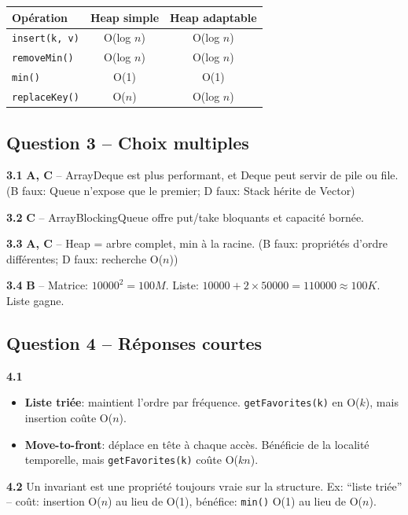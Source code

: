\documentclass[11pt,letterpaper]{article}
\begin{document}
\begin{center}
\renewcommand{\arraystretch}{1.5}
\begin{tabular}{|l|c|c|}
\hline
\textbf{Opération} & \textbf{Heap simple} & \textbf{Heap adaptable} \\
\hline
\texttt{insert(k, v)} & O(log $n$) & O(log $n$) \\
\hline
\texttt{removeMin()} & O(log $n$) & O(log $n$) \\
\hline
\texttt{min()} & O(1) & O(1) \\
\hline
\texttt{replaceKey()} & O($n$) & O(log $n$) \\
\hline
\end{tabular}
\end{center}

\subsection*{Question 3 -- Choix multiples}

\textbf{3.1} \textbf{A, C} -- ArrayDeque est plus performant, et Deque peut servir de pile ou file. (B faux: Queue n'expose que le premier; D faux: Stack hérite de Vector)

\textbf{3.2} \textbf{C} -- ArrayBlockingQueue offre put/take bloquants et capacité bornée.

\textbf{3.3} \textbf{A, C} -- Heap = arbre complet, min à la racine. (B faux: propriétés d'ordre différentes; D faux: recherche O($n$))

\textbf{3.4} \textbf{B} -- Matrice: $10000^2 = 100M$. Liste: $10000 + 2 \times 50000 = 110000 \approx 100K$. Liste gagne.

\subsection*{Question 4 -- Réponses courtes}

\textbf{4.1}
\begin{itemize}
    \item \textbf{Liste triée}: maintient l'ordre par fréquence. \texttt{getFavorites(k)} en O($k$), mais insertion coûte O($n$).
    \item \textbf{Move-to-front}: déplace en tête à chaque accès. Bénéficie de la localité temporelle, mais \texttt{getFavorites(k)} coûte O($kn$).
\end{itemize}

\textbf{4.2} Un invariant est une propriété toujours vraie sur la structure. Ex: ``liste triée'' -- coût: insertion O($n$) au lieu de O(1), bénéfice: \texttt{min()} O(1) au lieu de O($n$).
\end{document}
